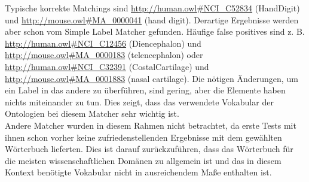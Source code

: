 		Typische korrekte Matchings sind \url{http://human.owl#NCI_C52834}
		(Hand\textunderscore Digit) und
		\url{http://mouse.owl#MA_0000041} (hand digit). Derartige Ergebnisse werden
		aber schon vom Simple Label Matcher gefunden. Häufige false positives sind
		z. B. \url{http://human.owl#NCI_C12456} (Diencephalon) und
		\url{http://mouse.owl#MA_0000183} (telencephalon) oder
		\url{http://human.owl#NCI_C32391} (Costal\textunderscore Cartilage) und
		\url{http://mouse.owl#MA_0001883} (nasal cartilage). Die nötigen Änderungen,
		um ein Label in das andere zu überführen, sind gering, aber die Elemente haben
		nichts miteinander zu tun. Dies zeigt, dass das verwendete Vokabular der
		Ontologien bei diesem Matcher sehr wichtig ist.\\
		Andere Matcher wurden in diesem Rahmen nicht betrachtet, da erste Tests mit
		ihnen schon vorher keine zufriedenstellenden Ergebnisse mit dem gewählten
		Wörterbuch lieferten.
		Dies ist darauf zurückzuführen, dass das Wörterbuch für die meisten
		wissenschaftlichen Domänen zu allgemein ist und das in diesem Kontext
		benötigte Vokabular nicht in ausreichendem Maße enthalten ist.
		
		\pagebreak[4]